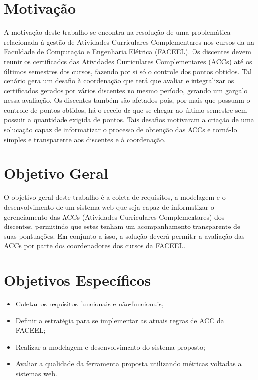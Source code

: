 \section{Motivação}

A motivação deste trabalho se encontra na resolução de uma problemática relacionada à gestão de Atividades Curriculares Complementares nos cursos da na Faculdade de Computação e Engenharia Elétrica (FACEEL). Os discentes devem reunir os certificados das Atividades Curriculares Complementares (ACCs) até os últimos semestres dos cursos, fazendo por si só o controle dos pontos obtidos. Tal cenário gera um desafio à coordenação que terá que avaliar e integralizar os certificados gerados por vários discentes no mesmo período, gerando um gargalo nessa avaliação. Os discentes também são afetados pois, por mais que possuam o controle de pontos obtidos, há o receio de que se chegar ao último semestre sem possuir a quantidade exigida de pontos. Tais desafios motivaram a criação de uma solucação capaz de informatizar o processo de obtenção das ACCs e torná-lo simples e transparente aos discentes e à coordenação.

\section{Objetivo Geral}

O objetivo geral deste trabalho é a coleta de requisitos, a modelagem e o desenvolvimento de um sistema web que seja capaz de informatizar o gerenciamento das ACCs (Atividades Curriculares Complementares) dos discentes, permitindo que estes tenham um acompanhamento transparente de suas pontuações. Em conjunto a isso, a solução deverá permitir a avaliação das ACCs por parte dos coordenadores dos cursos da FACEEL.

\section{Objetivos Específicos}

\begin{itemize}
    \item Coletar os requisitos funcionais e não-funcionais;
    \item Definir a estratégia para se implementar as atuais regras de ACC da FACEEL;
    \item Realizar a modelagem e desenvolvimento do sistema proposto; 
    \item Avaliar a qualidade da ferramenta proposta utilizando métricas voltadas a sistemas web.
    
\end{itemize}

